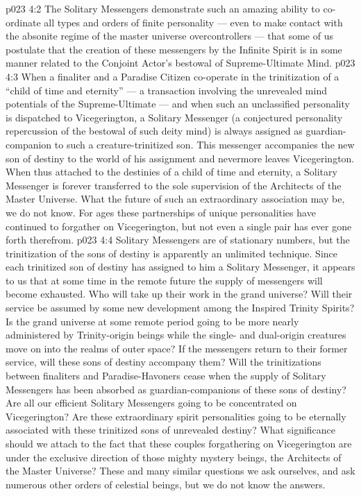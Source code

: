 \vs p023 4:2 The Solitary Messengers demonstrate such an amazing ability to co\hyp{}ordinate all types and orders of finite personality --- even to make contact with the absonite regime of the master universe overcontrollers --- that some of us postulate that the creation of these messengers by the Infinite Spirit is in some manner related to the Conjoint Actor’s bestowal of Supreme\hyp{}Ultimate Mind.
\vs p023 4:3 \pc When a finaliter and a Paradise Citizen co\hyp{}operate in the trinitization of a “child of time and eternity” --- a transaction involving the unrevealed mind potentials of the Supreme\hyp{}Ultimate --- and when such an unclassified personality is dispatched to Vicegerington, a Solitary Messenger (a conjectured personality repercussion of the bestowal of such deity mind) is always assigned as guardian\hyp{}companion to such a creature\hyp{}trinitized son. This messenger accompanies the new son of destiny to the world of his assignment and nevermore leaves Vicegerington. When thus attached to the destinies of a child of time and eternity, a Solitary Messenger is forever transferred to the sole supervision of the Architects of the Master Universe. What the future of such an extraordinary association may be, we do not know. For ages these partnerships of unique personalities have continued to forgather on Vicegerington, but not even a single pair has ever gone forth therefrom.
\vs p023 4:4 Solitary Messengers are of stationary numbers, but the trinitization of the sons of destiny is apparently an unlimited technique. Since each trinitized son of destiny has assigned to him a Solitary Messenger, it appears to us that at some time in the remote future the supply of messengers will become exhausted. Who will take up their work in the grand universe? Will their service be assumed by some new development among the Inspired Trinity Spirits? Is the grand universe at some remote period going to be more nearly administered by Trinity\hyp{}origin beings while the single\hyp{} and dual\hyp{}origin creatures move on into the realms of outer space? If the messengers return to their former service, will these sons of destiny accompany them? Will the trinitizations between finaliters and Paradise\hyp{}Havoners cease when the supply of Solitary Messengers has been absorbed as guardian\hyp{}companions of these sons of destiny? Are all our efficient Solitary Messengers going to be concentrated on Vicegerington? Are these extraordinary spirit personalities going to be eternally associated with these trinitized sons of unrevealed destiny? What significance should we attach to the fact that these couples forgathering on Vicegerington are under the exclusive direction of those mighty mystery beings, the Architects of the Master Universe? These and many similar questions we ask ourselves, and ask numerous other orders of celestial beings, but we do not know the answers.
